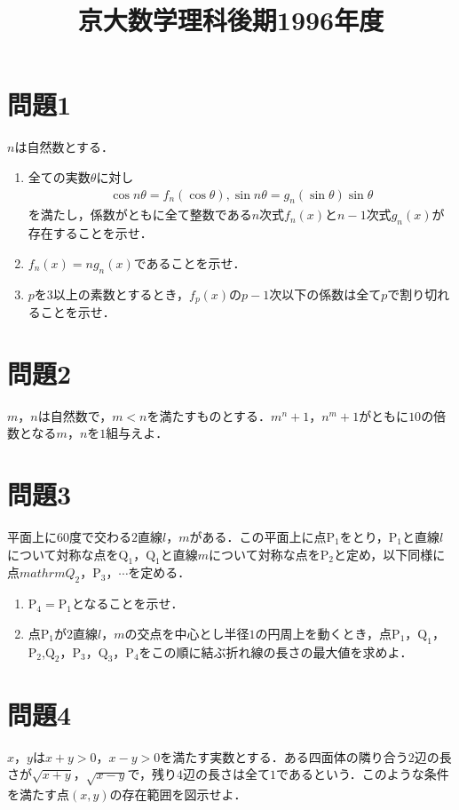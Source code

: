 \documentclass[unicode,12pt, A4j]{ltjsarticle}%
\title{京大数学理科後期1996年度}
\author{}
\date{}
\begin{document}
\maketitle

\section{問題1}
$n$は自然数とする．
\begin{enumerate}
 \item 全ての実数$\theta$に対し
       \begin{align*}
	\cos n\theta=f_n(\cos\theta), \sin n\theta=g_n(\sin\theta)\sin\theta
       \end{align*}
       を満たし，係数がともに全て整数である$n$次式$f_n(x)$と$n-1$次式$g_n(x)$が存在することを示せ．
 \item $f_n(x)=ng_n(x)$であることを示せ．
 \item $p$を$3$以上の素数とするとき，$f_p(x)$の$p-1$次以下の係数は全て$p$で割り切れることを示せ．
\end{enumerate}


\section{問題2}
$m$，$n$は自然数で，$m<n$を満たすものとする．$m^n+1$，$n^m+1$がともに$10$の倍数となる$m$，$n$を$1$組与えよ．

\section{問題3}
平面上に$60$度で交わる$2$直線$l$，$m$がある．この平面上に点$\mathrm{P}_1$をとり，$\mathrm{P}_1$と直線$l$について対称な点を$\mathrm{Q}_1$，$\mathrm{Q}_1$と直線$m$について対称な点を$\mathrm{P}_2$と定め，以下同様に点$mathrm{Q}_2$，$\mathrm{P}_3$，$\cdots$を定める．

\begin{enumerate}
 \item $\mathrm{P}_4=\mathrm{P}_1$となることを示せ．
 \item 点$\mathrm{P}_1$が$2$直線$l$，$m$の交点を中心とし半径$1$の円周上を動くとき，点$\mathrm{P}_1$，$\mathrm{Q}_1$，$\mathrm{P}_2$,$\mathrm{Q}_2$，$\mathrm{P}_3$，$\mathrm{Q}_3$，$\mathrm{P}_4$をこの順に結ぶ折れ線の長さの最大値を求めよ．
\end{enumerate}

\section{問題4}
$x$，$y$は$x+y>0$，$x-y>0$を満たす実数とする．ある四面体の隣り合う$2$辺の長さが$\sqrt{x+y}$，$\sqrt{x-y}$で，残り$4$辺の長さは全て$1$であるという．このような条件を満たす点$(x,y)$の存在範囲を図示せよ．
\end{document}

